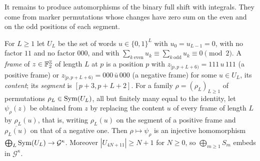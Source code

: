 It remains to produce automorphisms of the binary full shift with integrals. They come from marker permutations whose changes have zero sum on the even and on the odd positions of each segment.

\begin{lemma}\label{lin:markers}
For $L\ge1$ let $U_L$ be the set of words $u\in\{0,1\}^L$ with $u_0=u_{L-1}=0$, with no factor $11$ and no factor $000$, and with $\sum_{k\ \mathrm{even}}u_k\equiv\sum_{k\ \mathrm{odd}}u_k\equiv0\pmod2$. A \emph{frame} of $z\in\mathbb{F}_2^{\mathbb{Z}}$ of length $L$ at $p$ is a position $p$ with $z_{[p,p+L+6)}=111\,u\,111$ (a positive frame) or $z_{[p,p+L+6)}=000\,\bar u\,000$ (a negative frame) for some $u\in U_L$, its \emph{content}; its \emph{segment} is $[p+3,p+L+2]$. For a family $\rho=(\rho_L)_{L\ge1}$ of permutations $\rho_L\in\operatorname{Sym}(U_L)$, all but finitely many equal to the identity, let $\psi_\rho(z)$ be obtained from $z$ by replacing the content $u$ of every frame of length $L$ by $\rho_L(u)$, that is, writing $\rho_L(u)$ on the segment of a positive frame and $\overline{\rho_L(u)}$ on that of a negative one. Then $\rho\mapsto\psi_\rho$ is an injective homomorphism $\bigoplus_L\operatorname{Sym}(U_L)\to\mathcal G^{\kappa}$. Moreover $|U_{4N+11}|\ge N+1$ for $N\ge0$, so $\bigoplus_{m\ge1}S_m$ embeds in $\mathcal G^{\kappa}$.
\end{lemma}


